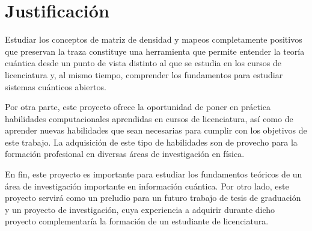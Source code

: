 \section*{Justificación}
Estudiar los conceptos de matriz de densidad y mapeos completamente
positivos que preservan la traza constituye una herramienta que permite 
entender la teoría cuántica desde un punto de vista distinto al que se estudia
en los cursos de licenciatura y, al mismo tiempo, comprender los fundamentos 
para estudiar sistemas cuánticos abiertos. 

Por otra parte, este proyecto ofrece la oportunidad de poner en práctica habilidades
computacionales aprendidas en cursos de licenciatura, así como de 
aprender nuevas habilidades que sean necesarias para cumplir con los objetivos
de este trabajo. La adquisición de este tipo de habilidades son de provecho para la formación 
profesional en diversas áreas de investigación en física. 

En fin, este proyecto es importante para estudiar los fundamentos teóricos
de un área de investigación importante en información cuántica. 
Por otro lado, este proyecto servirá como un preludio para un futuro trabajo de
tesis de graduación y un proyecto de investigación, cuya experiencia a adquirir durante
dicho proyecto complementaría la formación de un estudiante de licenciatura. 